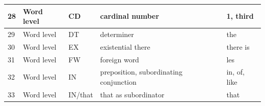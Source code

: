 \begin{longtable}{|p{}|p{}|p{}|p{}|p{}|}
		\rowcolor[HTML]{9AFF99} 
		28                                                        & Word level                                                  & CD                                                         & cardinal number                                                                                                 & 1, third                                                                        \\ \hline
		\rowcolor[HTML]{9AFF99} 
		29                                                        & Word level                                                  & DT                                                         & determiner                                                                                                      & the                                                                             \\ \hline
		\rowcolor[HTML]{9AFF99} 
		30                                                        & Word level                                                  & EX                                                         & existential there                                                                                               & there is                                                                        \\ \hline
		\rowcolor[HTML]{9AFF99} 
		31                                                        & Word level                                                  & FW                                                         & foreign word                                                                                                    & les                                                                             \\ \hline
		\rowcolor[HTML]{9AFF99} 
		32                                                        & Word level                                                  & IN                                                         & preposition, subordinating conjunction                                                                          & in, of, like                                                                    \\ \hline
		\rowcolor[HTML]{9AFF99} 
		33                                                        & Word level                                                  & IN/that                                                    & that as subordinator                                                                                            & that                                                                            \\ \hline

\end{longtable}
